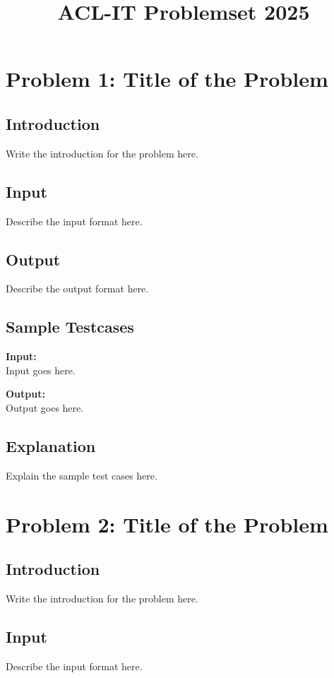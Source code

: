 \documentclass[12pt]{article}
\title{ACL-IT Problemset 2025}
\begin{document}
\maketitle

\section*{Problem 1: Title of the Problem}

\subsection*{Introduction}
Write the introduction for the problem here.

\subsection*{Input}
Describe the input format here.

\subsection*{Output}
Describe the output format here.

\subsection*{Sample Testcases}
\textbf{Input:} \\
Input goes here.

\textbf{Output:} \\
Output goes here.

\subsection*{Explanation}
Explain the sample test cases here.

\newpage

\section*{Problem 2: Title of the Problem}

\subsection*{Introduction}
Write the introduction for the problem here.

\subsection*{Input}
Describe the input format here.
\end{document}
